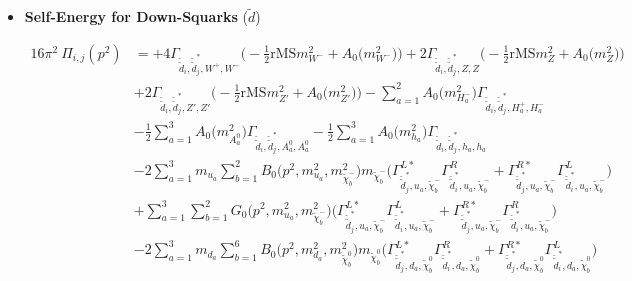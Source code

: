 \begin{itemize} 
\item {\bf Self-Energy for Down-Squarks} \thickspace (\(\tilde{d}\)) 

\begin{align} 
16\pi^2 \ \Pi_{i,j}(p^2) &= +4 {\Gamma_{\check{\tilde{d}}_{{i}},\check{\tilde{d}}^*_{{j}},W^+,W^-}} \Big(-\frac{1}{2} \text{rMS} m^2_{W^-}  + {A_0\Big(m^2_{W^-}\Big)}\Big)+2 {\Gamma_{\check{\tilde{d}}_{{i}},\check{\tilde{d}}^*_{{j}},Z,Z}} \Big(-\frac{1}{2} \text{rMS} m^2_{Z}  + {A_0\Big(m^2_{Z}\Big)}\Big)\nonumber \\ 
 &+2 {\Gamma_{\check{\tilde{d}}_{{i}},\check{\tilde{d}}^*_{{j}},{Z'},{Z'}}} \Big(-\frac{1}{2} \text{rMS} m^2_{{Z'}}  + {A_0\Big(m^2_{{Z'}}\Big)}\Big)- \sum_{a=1}^{2}{A_0\Big(m^2_{H^-_{{a}}}\Big)} {\Gamma_{\check{\tilde{d}}_{{i}},\check{\tilde{d}}^*_{{j}},H^+_{{a}},H^-_{{a}}}}  \nonumber \\ 
 &-\frac{1}{2} \sum_{a=1}^{3}{A_0\Big(m^2_{A^0_{{a}}}\Big)} {\Gamma_{\check{\tilde{d}}_{{i}},\check{\tilde{d}}^*_{{j}},A^0_{{a}},A^0_{{a}}}}  -\frac{1}{2} \sum_{a=1}^{3}{A_0\Big(m^2_{h_{{a}}}\Big)} {\Gamma_{\check{\tilde{d}}_{{i}},\check{\tilde{d}}^*_{{j}},h_{{a}},h_{{a}}}}  \nonumber \\ 
 &-2 \sum_{a=1}^{3}m_{u_{{a}}} \sum_{b=1}^{2}{B_0\Big(p^{2},m^2_{u_{{a}}},m^2_{\tilde{\chi}^-_{{b}}}\Big)} m_{\tilde{\chi}^-_{{b}}} \Big({\Gamma^{L*}_{\check{\tilde{d}}^*_{{j}},u_{{a}},\tilde{\chi}^-_{{b}}}} {\Gamma^R_{\check{\tilde{d}}^*_{{i}},u_{{a}},\tilde{\chi}^-_{{b}}}}  + {\Gamma^{R*}_{\check{\tilde{d}}^*_{{j}},u_{{a}},\tilde{\chi}^-_{{b}}}} {\Gamma^L_{\check{\tilde{d}}^*_{{i}},u_{{a}},\tilde{\chi}^-_{{b}}}} \Big)  \nonumber \\ 
 &+\sum_{a=1}^{3}\sum_{b=1}^{2}{G_0\Big(p^{2},m^2_{u_{{a}}},m^2_{\tilde{\chi}^-_{{b}}}\Big)} \Big({\Gamma^{L*}_{\check{\tilde{d}}^*_{{j}},u_{{a}},\tilde{\chi}^-_{{b}}}} {\Gamma^L_{\check{\tilde{d}}^*_{{i}},u_{{a}},\tilde{\chi}^-_{{b}}}}  + {\Gamma^{R*}_{\check{\tilde{d}}^*_{{j}},u_{{a}},\tilde{\chi}^-_{{b}}}} {\Gamma^R_{\check{\tilde{d}}^*_{{i}},u_{{a}},\tilde{\chi}^-_{{b}}}} \Big)\nonumber \\ 
 &-2 \sum_{a=1}^{3}m_{d_{{a}}} \sum_{b=1}^{6}{B_0\Big(p^{2},m^2_{d_{{a}}},m^2_{\tilde{\chi}^0_{{b}}}\Big)} m_{\tilde{\chi}^0_{{b}}} \Big({\Gamma^{L*}_{\check{\tilde{d}}^*_{{j}},d_{{a}},\tilde{\chi}^0_{{b}}}} {\Gamma^R_{\check{\tilde{d}}^*_{{i}},d_{{a}},\tilde{\chi}^0_{{b}}}}  + {\Gamma^{R*}_{\check{\tilde{d}}^*_{{j}},d_{{a}},\tilde{\chi}^0_{{b}}}} {\Gamma^L_{\check{\tilde{d}}^*_{{i}},d_{{a}},\tilde{\chi}^0_{{b}}}} \Big)  \nonumber \\ 

\end{align}
\end{itemize}

